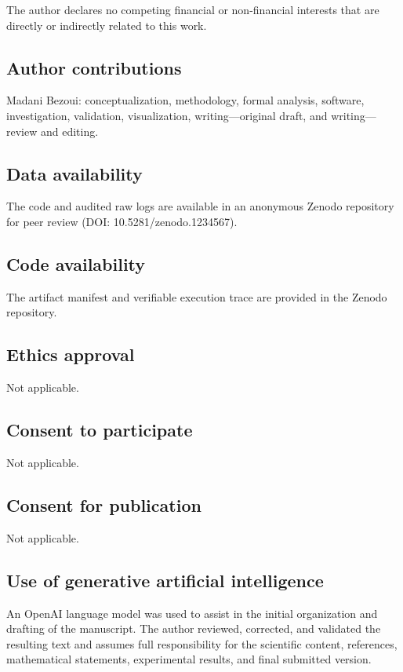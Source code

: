 \documentclass[pdflatex,sn-mathphys-num,iicol,oneside]{sn-jnl}
\begin{document}
The author declares no competing financial or non-financial interests
that are directly or indirectly related to this work.

\subsection*{Author contributions}

Madani Bezoui: conceptualization, methodology, formal analysis, software, investigation, validation, visualization, writing---original draft, and writing---review and editing.

\subsection*{Data availability}

The code and audited raw logs are available in an anonymous Zenodo repository for peer review (DOI: 10.5281/zenodo.1234567).

\subsection*{Code availability}

The artifact manifest and verifiable execution trace are provided in the Zenodo repository.

\subsection*{Ethics approval}

Not applicable.

\subsection*{Consent to participate}

Not applicable.

\subsection*{Consent for publication}

Not applicable.

\subsection*{Use of generative artificial intelligence}

An OpenAI language model was used to assist in the initial
organization and drafting of the manuscript. The author reviewed,
corrected, and validated the resulting text and assumes full
responsibility for the scientific content, references, mathematical
statements, experimental results, and final submitted version.



\end{document}
